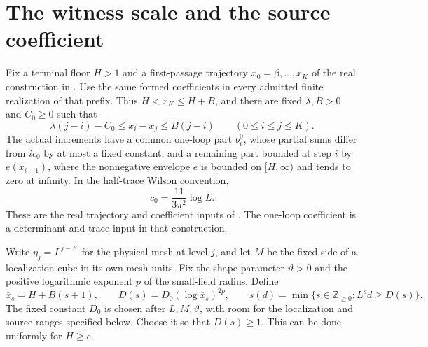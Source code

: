 \documentclass[11pt,letterpaper,reqno]{amsart}
\numberwithin{equation}{section}
\theoremstyle{definition}
\theoremstyle{remark}
\begin{document}
\section{The witness scale and the source coefficient}
\label{fp:sec-witness}

Fix a terminal floor \(H>1\) and a first-passage trajectory
\(x_0=\beta,\ldots,x_K\) of the real construction in
\cite[Theorem~A]{RT}. Use the same formed coefficients in every
admitted finite realization of that prefix. Thus
\(H<x_K\le H+B\), and there are fixed \(\lambda,B>0\) and \(C_0\ge0\)
such that
\begin{equation}\label{fp:eq-depth-drift}
 \lambda(j-i)-C_0\le x_i-x_j\le B(j-i)
 \qquad (0\le i\le j\le K).
\end{equation}
The actual increments have a common one-loop part \(b_i^0\),
whose partial sums differ from \(ic_0\) by at most a fixed
constant, and a remaining part bounded at step \(i\) by
\(e(x_{i-1})\), where the nonnegative envelope \(e\) is bounded on \([H,\infty)\)
and tends to zero at infinity.
In the half-trace Wilson convention,
\[
 c_0=\frac{11}{3\pi^2}\log L.
\]
These are the real trajectory and coefficient inputs of
\cite{RT}. The one-loop coefficient is a determinant and trace
input in that construction.

Write \(\eta_j=L^{j-K}\) for the physical mesh at level \(j\), and
let \(M\) be the fixed side of a localization cube in its own
mesh units. Fix the shape parameter \(\vartheta>0\) and the
positive logarithmic exponent \(p\) of the small-field radius.
Define
\begin{equation}\label{fp:eq-witness-room}
 \overline x_s=H+B(s+1),\qquad
 D(s)=D_0(\log\overline x_s)^{2p},\qquad
 s(d)=\min\{s\in\mathbb Z_{\ge0}:L^sd\ge D(s)\}.
\end{equation}
The fixed constant \(D_0\) is chosen after \(L,M,\vartheta\), with
room for the localization and source ranges specified below.
Choose it so that \(D(s)\ge1\). This can be done uniformly for
\(H\ge e\).
\end{document}
